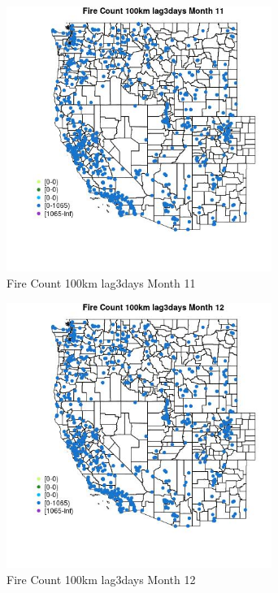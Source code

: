 \begin{figure} 
\centering  
\includegraphics[width=0.77\textwidth]{Code_Outputs/Report_ML_input_PM25_Step4_part_f_de_duplicated_aveswNAs_MapObsMo11Fire_Count_100km_lag3days.jpg} 
\caption{\label{fig:Report_ML_input_PM25_Step4_part_f_de_duplicated_aveswNAsMapObsMo11Fire_Count_100km_lag3days}Fire Count 100km lag3days Month 11} 
\end{figure} 
 

\begin{figure} 
\centering  
\includegraphics[width=0.77\textwidth]{Code_Outputs/Report_ML_input_PM25_Step4_part_f_de_duplicated_aveswNAs_MapObsMo12Fire_Count_100km_lag3days.jpg} 
\caption{\label{fig:Report_ML_input_PM25_Step4_part_f_de_duplicated_aveswNAsMapObsMo12Fire_Count_100km_lag3days}Fire Count 100km lag3days Month 12} 
\end{figure} 
 


